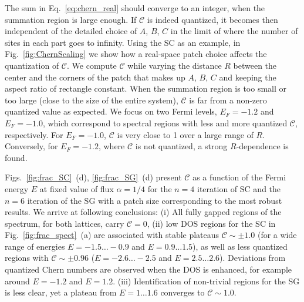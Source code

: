 {The sum in Eq.~\eqref{eq:chern_real} should converge to an integer, when the summation region is large enough. If $\mathcal{C}$ is indeed quantized, it becomes then independent of the detailed choice of $A$, $B$, $C$ in the limit of where the number of sites in each part goes to infinity. Using the SC as an example, in Fig.~\ref{fig:ChernScaling} we show how a real-space patch choice affects the quantization of $\mathcal{C}$. We compute $\mathcal{C}$ while varying the distance $R$ between the center and the corners of the patch that makes up $A$, $B$, $C$ and keeping the aspect ratio of rectangle constant. When the summation region is too small or too large (close to the size of the entire system), $\mathcal{C}$ is far from a non-zero quantized value as expected. We focus on two Fermi levels, $E_F = -1.2$ and $E_F = -1.0$, which correspond to spectral regions with less and more quantized $\mathcal{C}$, respectively. For $E_F = -1.0$, $\mathcal{C}$ is very close to 1 over a large range of $R$. Conversely, for $E_F = -1.2$, where $\mathcal{C}$ is not quantized, a strong $R$-dependence is found.

Figs.~\ref{fig:frac_SC}~(d), \ref{fig:frac_SG}~(d) present $\mathcal{C}$ as a function of the Fermi energy $E$ at fixed value of flux $ \alpha =1/4$ for the $n=4$ iteration of SC and the $n=6$ iteration of the SG with a patch size corresponding to the most robust results. We arrive at following conclusions: (i) All fully gapped regions of the spectrum, for both lattices, carry $\mathcal{C}=0$, (ii) low DOS regions for the SC in Fig.~\ref{fig:frac_spect}~(a) are associated with stable plateaus $\mathcal{C} \sim \pm 1.0$ (for a wide range of energies $E = -1.5 \ldots - 0.9$ and $E = 0.9 \ldots 1.5$), as well as less quantized regions with $\mathcal{C} \sim \pm 0.96$ ($E = -2.6\ldots -2.5$ and $E = 2.5\ldots 2.6$). Deviations from quantized Chern numbers are observed when the DOS is enhanced, for example around $E = -1.2$ and $E = 1.2$. (iii) Identification of non-trivial regions for the SG is less clear, yet a plateau from $E = 1\ldots 1.6$ converges to $\mathcal{C} \sim 1.0$. 

}
